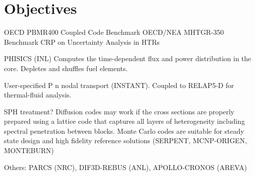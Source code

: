 \documentclass[11pt,letterpaper]{article}
\begin{document}
\section{Objectives}



OECD PBMR400 Coupled Code Benchmark %
OECD/NEA MHTGR-350 Benchmark %
CRP on Uncertainty Analysis in HTRs %
\cite{gougar_htgr_2016}

PHISICS (INL) %
Computes the time-dependent flux and power distribution in the core.
Depletes and shuffles fuel elements.

User-specified P n nodal transport (INSTANT). Coupled to
RELAP5-D for thermal-fluid analysis.

SPH treatment?
Diffusion codes may work if the cross sections are properly prepared using a lattice code that captures all layers of heterogeneity including spectral penetration between blocks. Monte Carlo codes are suitable for steady state design and high fidelity reference solutions (SERPENT, MCNP-ORIGEN, MONTEBURN)

Others: PARCS (NRC), DIF3D-REBUS (ANL), APOLLO-CRONOS (AREVA)
\cite{gougar_htgr_2016}



\cite{gougar_htgr_2016}

\pagebreak


\end{document}
